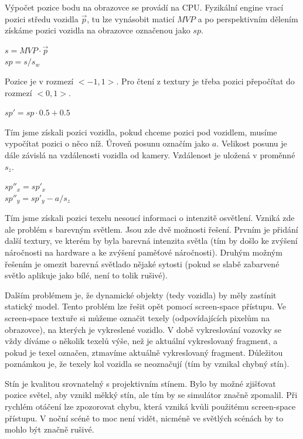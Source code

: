 \documentclass[11pt,twoside,a4paper]{book}
\begin{document}
Výpočet pozice bodu na obrazovce se provádí na CPU. Fyzikální engine vrací pozici středu vozidla $\vec{p}$, tu lze vynásobit maticí $MVP$ a po perspektivním dělením získáme pozici vozidla na obrazovce označenou jako $sp$. 
\begin{center}
$s = MVP \cdot \vec{p}$\\
$sp = s / s_w$
\end{center}
Pozice je v rozmezí $<-1, 1>$. Pro čtení z textury je třeba pozici přepočítat do rozmezí $<0, 1>$.
\begin{center}
$sp' = sp \cdot 0.5 + 0.5$
\end{center}

Tím jsme získali pozici vozidla, pokud chceme pozici pod vozidlem, musíme vypočítat pozici o něco níž. Úroveň posunu označím jako $a$. Velikost posunu je dále závislá na vzdálenosti vozidla od kamery. Vzdálenost je uložená v proměnné $s_z$.
\begin{center}
$sp''_x = sp'_x$\\
$sp''_y = sp'_y - a / s_z$
\end{center}

Tím jsme získali pozici texelu nesoucí informaci o intenzitě osvětlení. Vzniká zde ale problém s barevným světlem. Jsou zde dvě možnosti řešení. Prvním je přidání další textury, ve kterém by byla barevná intenzita světla (tím by došlo ke zvýšení náročnosti na hardware a ke zvýšení paměťové náročnosti). Druhým možným řešením je omezit barevná světla\linebreak do nějaké sytosti (pokud se slabě zabarvené světlo aplikuje jako bílé, není to tolik rušivé).
\newpage

Dalším problémem je, že dynamické objekty (tedy vozidla) by měly zastínit statický model. Tento problém lze řešit opět pomocí screen-space přístupu. Ve screen-space textuře si můžeme označit texely (odpovídajících pixelům na obrazovce), na kterých je vykreslené vozidlo. V době vykreslování vozovky se vždy díváme o několik texelů výše, než je aktuální vykreslovaný fragment, a pokud je texel označen, ztmavíme aktuálně vykreslovaný fragment. Důležitou poznámkou je, že texely kol vozidla se neoznačují (tím by vznikal chybný stín).

Stín je kvalitou srovnatelný s projektivním stínem. Bylo by možné zjišťovat pozice světel, aby vznikl měkký stín, ale tím by se simulátor značně zpomalil. Při rychlém otáčení lze zpozorovat chybu, která vzniká kvůli použitému screen-space přístupu. V noční scéně to moc není vidět, nicméně ve světlých scénách by to mohlo být značně rušivé.
\end{document}
